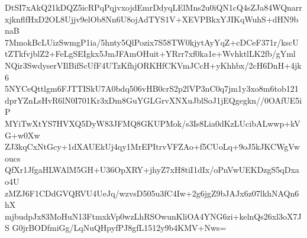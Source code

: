 DtSI7xAkQ21kDQZ5icRPqPqjvxojdEmrDdyqLElMns2u0iQN1cQ4sZJa84WQnarr
xjknflfHxD2OL8Ujjv9elOb8Nn6U8ojAdTYS1V+XEVPBkxYJIKqWuhS+dHN9bnaB
7MmokBcLUizSwmgP1ia/5hnty5QlPozix7S58TW0kjytAyYqZ+cDCeF371r/kscU
tZTkfvjblZ2+FeLgSEIgkx5JmJFAmOHuit+YRrr7xf0ka1e+WvhktlLK2fb/gYml
NQir3SwdyserVIlBifScUfF4UTzKfhjORKHfCKVmJCcH+yKhhbx/2cH6DnH+4jk6
5NYCeQttlgm6FJTTISkU7A0bdq506vHB0crS2p2lVP3nC0q7jm1y3xo8m6tob121
dprYZnLsHvR6lN0I701Kr3xDm8GuYGLGrvXNXuJblSoJ1jEQgegkn//0OAfUE5iP
MYiTwXtYS7HVXQ5DyW83JFMQ8GKUPMok/s3Is8Lia0dKzLUcibALwwp+kVG+w0Xw
ZJ3kqCxNtGcy+1dXAUEkUj4qy1MrEPItrvVFZAo+f5CUoLq+9oJ5kJKCWgVwoucs
QfXr1JfgaHLWAlM5GH+U36OpXRY+jhyZ7xH8tiI1dIx/oPnVwUEKDzgS5qDxao4U
zMZJ6F1CDdGVQRVU4UeJq/wzvsD505u3fC4Iw+2g6jgZ9bJAJx6z07lkhNAQn6hX
mjbudpJx83MoHuN13FtmxkVp0wzLhRSOwunKliOA4YNG6zi+kelnQs26xl3oX7JS
G0jrBODfmiGg/LqNuQHpyfPJ8gfL1512y9b4KMV+Nws=
